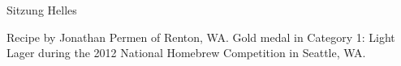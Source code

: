 \begin{recipe}{Sitzung Helles} %

\begin{aboutblock}
Recipe by Jonathan Permen of Renton, WA. Gold medal in Category 1: Light Lager
during the 2012 National Homebrew Competition in Seattle, WA.
\sourceaha
\end{aboutblock}


\begin{methodandtiming}

\begin{mashsteps}
\end{mashsteps}

\begin{fermentationsteps}
\end{fermentationsteps}

\end{methodandtiming}

\recipebreak

\begin{ingredientsblock}

\begin{malts}
\end{malts}

\begin{hops}
\end{hops}


\end{ingredientsblock}

\end{recipe}

